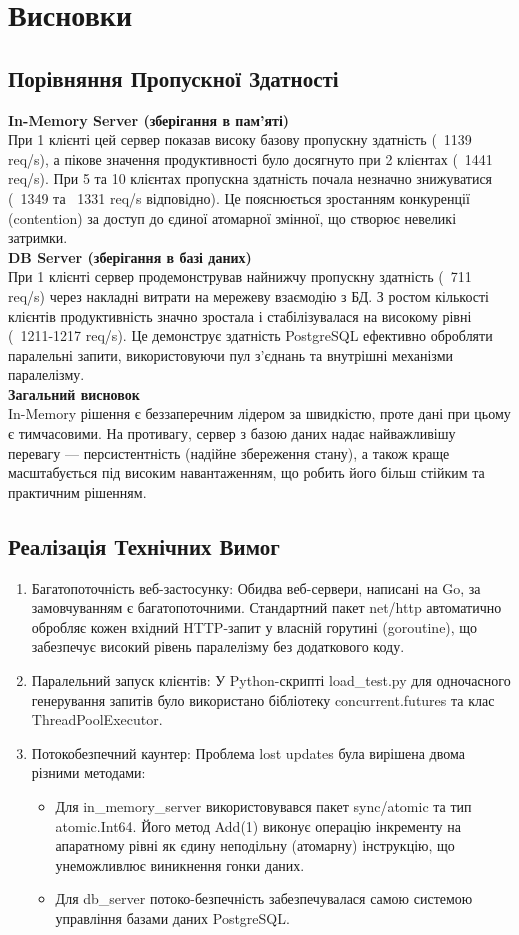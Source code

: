 \documentclass[12pt,a4paper]{article}
\begin{document}
\section{Висновки}
\subsection{Порівняння Пропускної Здатності}

\textbf{In-Memory Server (зберігання в пам'яті)}\\
При 1 клієнті цей сервер показав високу базову пропускну здатність (~1139 req/s), 
а пікове значення продуктивності було досягнуто при 2 клієнтах (~1441 req/s).
При 5 та 10 клієнтах пропускна здатність почала незначно знижуватися (~1349 та ~1331 req/s відповідно). 
Це пояснюється зростанням конкуренції (contention) за доступ до єдиної атомарної змінної, що створює невеликі затримки.\\
\textbf{DB Server (зберігання в базі даних)}\\
При 1 клієнті сервер продемонстрував найнижчу пропускну здатність (~711 req/s) через накладні витрати на мережеву взаємодію з БД.
З ростом кількості клієнтів продуктивність значно зростала і стабілізувалася на високому рівні (~1211-1217 req/s). 
Це демонструє здатність PostgreSQL ефективно обробляти паралельні запити, використовуючи пул з'єднань та внутрішні механізми паралелізму.\\
\textbf{Загальний висновок}\\
In-Memory рішення є беззаперечним лідером за швидкістю, проте дані при цьому є тимчасовими. 
На противагу, сервер з базою даних надає найважливішу перевагу — персистентність (надійне збереження стану), 
а також краще масштабується під високим навантаженням, що робить його більш стійким та практичним рішенням.
\subsection{Реалізація Технічних Вимог}
\begin{enumerate}
\item Багатопоточність веб-застосунку: Обидва веб-сервери, написані на Go, за замовчуванням є багатопоточними. Стандартний пакет net/http автоматично обробляє кожен вхідний HTTP-запит у власній горутині (goroutine), що забезпечує високий рівень паралелізму без додаткового коду.
\item Паралельний запуск клієнтів: У Python-скрипті load\_test.py для одночасного генерування запитів було використано бібліотеку concurrent.futures та клас ThreadPoolExecutor.
\item Потокобезпечний каунтер: Проблема lost updates була вирішена двома різними методами:
\begin{itemize}
\item Для in\_memory\_server використовувався пакет sync/atomic та тип atomic.Int64. Його метод Add(1) виконує операцію інкременту на апаратному рівні як єдину неподільну (атомарну) інструкцію, що унеможливлює виникнення гонки даних.
\item Для db\_server потоко-безпечність забезпечувалася самою системою управління базами даних PostgreSQL.
\end{itemize}
\end{enumerate}
\end{document}
